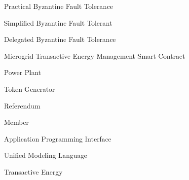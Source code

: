 {Practical Byzantine Fault Tolerance}

{Simplified Byzantine Fault Tolerant}

{Delegated Byzantine Fault Tolerance}

{Microgrid Transactive Energy Management Smart Contract}

{Power Plant}

{Token Generator}

{Referendum}

{Member}

{Application Programming Interface}

{Unified Modeling Language}

{Transactive Energy}
